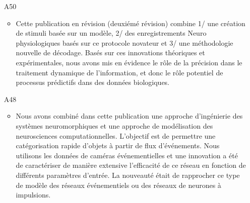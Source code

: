 \begin{enumerate}
%

\item[A50] %
\begin{itemize}
  \item Cette publication en révision (deuxiémé révision) combine 1/ une création de stimuli basée sur un modèle, 2/ des enregistrements Neuro physiologiques basés sur ce protocole novateur et 3/ une méthodologie nouvelle de décodage. Basés sur ces innovations théoriques et expérimentales, nous avons mis en évidence le rôle de la précision dans le traitement dynamique de l'information, et donc le rôle potentiel de processus prédictifs dans des données biologiques.
\end{itemize}

\item[A48] %
\begin{itemize}
  \item Nous avons combiné dans cette publication une approche d'ingénierie des systèmes neuromorphiques et une approche de modélisation des neurosciences computationnelles. L'objectif est de permettre une catégorisation rapide d'objets à partir de flux d'événements. Nous utilisons les données de caméras événementielles et une innovation a été de caractériser de manière extensive l'efficacité de ce réseau en fonction de différents paramètres d'entrée. La nouveauté était de rapprocher ce type de modèle des réseaux événementiels ou des réseaux de neurones à impulsions.
\end{itemize}

%
%


\end{enumerate}
